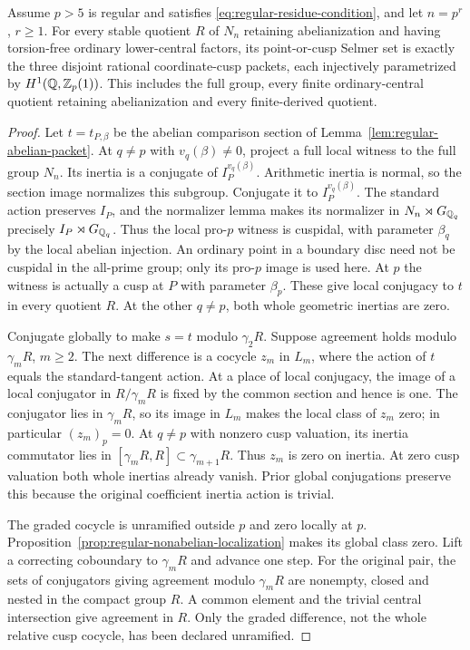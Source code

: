 \begin{theorem}
\label{thm:regular-prime-packets}
Assume $p>5$ is regular and satisfies
\eqref{eq:regular-residue-condition}, and let $n=p^r$, $r\ge1$.
For every stable quotient $R$ of $N_n$ retaining abelianization
and having torsion-free ordinary lower-central factors, its
point-or-cusp Selmer set is exactly the three disjoint rational
coordinate-cusp packets, each injectively parametrized by
$H^1(\mathbb Q,\mathbb Z_p(1))$. This includes the full group, every finite
ordinary-central quotient retaining abelianization and every
finite-derived quotient.
\end{theorem}
\begin{proof}
Let $t=t_{P,\beta}$ be the abelian comparison section of
Lemma~\ref{lem:regular-abelian-packet}.
At $q\ne p$ with $v_q(\beta)\ne0$, project a full local witness
to the full group $N_n$. Its inertia is a conjugate of
$I_P^{v_q(\beta)}$. Arithmetic inertia is normal, so the section
image normalizes this subgroup. Conjugate it to $I_P^{v_q(\beta)}$.
The standard action preserves $I_P$, and the normalizer lemma
makes its normalizer in $N_n\rtimes G_{\mathbb Q_q}$ precisely
$I_P\rtimes G_{\mathbb Q_q}$. Thus the local pro-$p$ witness is
cuspidal, with parameter $\beta_q$ by the local abelian injection.
An ordinary point in a boundary disc need not be cuspidal in the
all-prime group; only its pro-$p$ image is used here.
At $p$ the witness is actually a cusp at $P$ with parameter
$\beta_p$. These give local conjugacy to $t$ in every quotient $R$.
At the other $q\ne p$, both whole geometric inertias are zero.

Conjugate globally to make $s=t$ modulo $\gamma_2R$.
Suppose agreement holds modulo $\gamma_mR$, $m\ge2$.
The next difference is a cocycle $z_m$ in $L_m$, where the action
of $t$ equals the standard-tangent action.
At a place of local conjugacy, the image of a local conjugator
in $R/\gamma_mR$ is fixed by the common section and hence is one.
The conjugator lies in $\gamma_mR$, so its image in $L_m$
makes the local class of $z_m$ zero; in particular $(z_m)_p=0$.
At $q\ne p$ with nonzero cusp valuation, its inertia commutator
lies in $[\gamma_mR,R]\subset\gamma_{m+1}R$. Thus $z_m$ is zero
on inertia. At zero cusp valuation both whole inertias already
vanish. Prior global conjugations preserve this because the
original coefficient inertia action is trivial.

The graded cocycle is unramified outside $p$ and zero locally at
$p$. Proposition~\ref{prop:regular-nonabelian-localization} makes
its global class zero. Lift a correcting coboundary to $\gamma_mR$
and advance one step. For the original pair, the sets of conjugators
giving agreement modulo $\gamma_mR$ are nonempty, closed and nested
in the compact group $R$. A common element and the trivial central
intersection give agreement in $R$. Only the graded difference,
not the whole relative cusp cocycle, has been declared unramified.


\end{proof}
